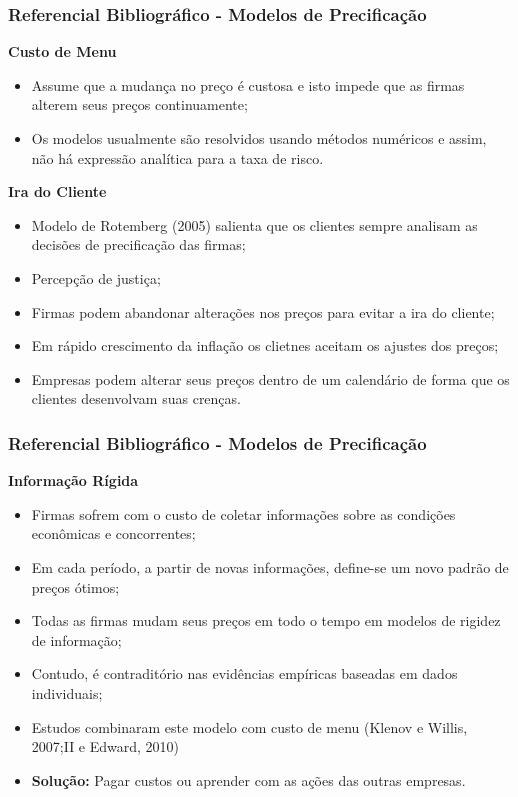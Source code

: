 \documentclass[aspectratio=169]{beamer}
\begin{document}
\begin{frame}\frametitle{Referencial Bibliográfico - Modelos de Precificação}
  \textbf{Custo de Menu}
  \begin{itemize}
  \item Assume que a mudança no preço é custosa e isto impede que as firmas alterem seus preços continuamente;
  \item Os modelos usualmente são resolvidos usando métodos numéricos e assim, não há expressão analítica para a taxa de risco.
  \end{itemize}
  \textbf{Ira do Cliente}
  \begin{itemize}
  \item Modelo de Rotemberg (2005) salienta que os clientes sempre analisam as decisões de precificação das firmas;
  \item Percepção de justiça;
  \item Firmas podem abandonar alterações nos preços para evitar a ira do cliente;
  \item Em rápido crescimento da inflação os clietnes aceitam os ajustes dos preços;
  \item Empresas podem alterar seus preços dentro de um calendário de forma que os clientes desenvolvam suas crenças.
  \end{itemize}
\end{frame}

\begin{frame}\frametitle{Referencial Bibliográfico - Modelos de Precificação}
  \textbf{Informação Rígida}
  \begin{itemize}
  \item Firmas sofrem com o custo de coletar informações sobre as condições econômicas e concorrentes;
  \item Em cada período, a partir de novas informações, define-se um novo padrão de preços ótimos;
  \item Todas as firmas mudam seus preços em todo o tempo em modelos de rigidez de informação;
  \item Contudo, é contraditório nas evidências empíricas baseadas em dados individuais;
  \item Estudos combinaram este modelo com custo de menu (Klenov e Willis, 2007;II e Edward, 2010)
  \item \textbf{Solução:} Pagar custos ou aprender com as ações das outras empresas.
  \end{itemize}
\end{frame}
\end{document}
